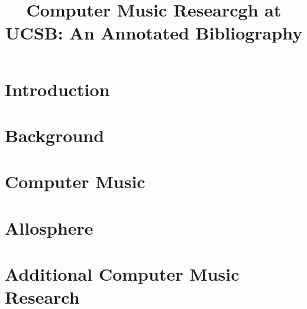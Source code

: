 
\title{Computer Music Researcgh at UCSB: An Annotated Bibliography}



\maketitle
\begin{abstract}

\end{abstract}




\section{Introduction}
 

\section{Background}\label{sec:Background}


\section{Computer Music}\label{sec:ComputerMusic}


\section{Allosphere}\label{sec:Allosphere}


\section{Additional Computer Music Research}\label{sec:CompMus}





%
%
